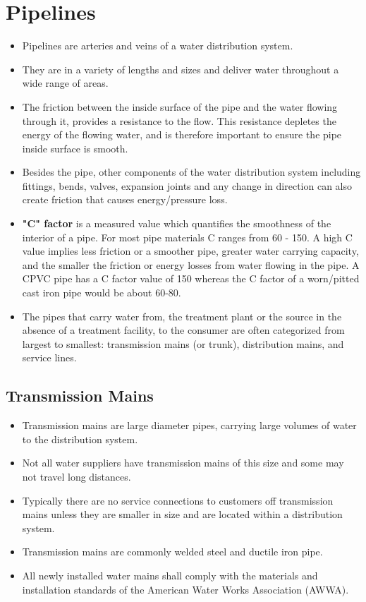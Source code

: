 \section{Pipelines}
\begin{itemize}
\item Pipelines are arteries and veins of a water distribution system. 
\item They are in a variety of lengths and sizes and deliver water throughout a wide range of areas.
\item The friction between the inside surface of the pipe and the water flowing through it, provides a resistance to the flow.  This resistance depletes the energy of the flowing water,  and is therefore important to ensure the pipe inside surface is smooth.
\item Besides the pipe, other components of the water distribution system including fittings, bends, valves, expansion joints and any change in direction can also create friction that causes energy/pressure loss.
\item \textbf{"C" factor}  is a measured value which quantifies the smoothness of the interior of a pipe. For most pipe materials C ranges from 60 - 150. A high C value implies less friction or a smoother pipe, greater water carrying capacity, and the smaller the friction or energy losses from water flowing in the pipe. A CPVC pipe has a C factor value of 150 whereas the C factor of a worn/pitted cast iron pipe would be about 60-80.
\item The pipes that carry water from, the treatment plant or the source in the absence of a treatment facility, to the consumer are often categorized from largest to smallest: transmission mains (or trunk), distribution mains, and service lines.
\end{itemize}
\subsection{Transmission Mains}
\begin{itemize}
\item Transmission mains are large diameter pipes, carrying large volumes of water to the distribution system. 
\item Not all water suppliers have transmission mains of this size and some may not travel long distances. 
\item Typically there are no service connections to
customers off transmission mains unless they are smaller in size and are located within a distribution system.
\item Transmission mains are commonly welded steel and ductile iron pipe.
\item All newly installed water mains shall comply with the materials and installation standards of the American Water Works Association (AWWA).
\end{itemize}
